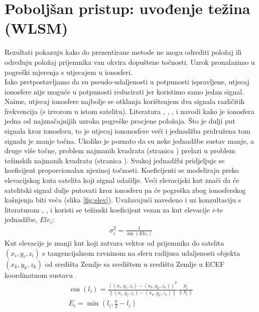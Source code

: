 \documentclass[a4paper,twoside,12pt]{memoir} %
\begin{document}

\section{Poboljšan pristup: uvođenje težina (WLSM)}\label{sec:algTezine}%
Rezultati pokazuju kako do prezentirane metode ne mogu odrediti položaj ili određuju položaj prijemnika van okvira dopuštene točnosti.
Uzrok pronalazimo u pogreški mjerenja s utjecajem u ionosferi.\\
Iako pretpostavljamo da su pseudo-udaljenosti u potpunosti ispravljene, utjecaj ionosfere nije moguće u potpunosti reducirati jer koristimo samo jedan signal.
Naime, utjecaj ionosfere najbolje se otklanja korištenjem dva signala različitih frekvencija (s izvorom u istom satelitu). 
Literatura \cite{ref:4}, \cite{ref:9}, \cite{ref:10}, \cite{ref:38} i
\cite{ref:34} navodi kako je ionosfera jedna od najznačajnijih uzroka pogreške
procjene položaja.
Što je dulji put signala kroz ionosferu, to je utjecaj iononosfere veći i jednadžba pridružena tom signalu
je manje točna. Ukoliko je poznato da su neke jednadžbe sustav manje, a druge više točne, problem najmanih kvadrata
(stranica \pageref{code:iterLSM}) prelazi u problem težinskih najmanih kvadrata (stranica \pageref{code:iterLSMW}).
Svakoj jednadžbi pridjeljuje se koeficijent proporcionalan njezinoj točnosti.
Koeficijenti se modeliraju preko elevacijskog kuta satelita koji signal odašilje.
Veći elevacijski kut znači da će satelitski signal dulje putovati kroz ionosferu pa će pogreška
zbog ionosferskog kašnjenja biti veća (slika \ref{fig:elev}).
Uvažavajući navedeno i uz konzultaciju s literaturom \cite{ref:13}, \cite{ref:34},
\cite{ref:45} i \cite{ref:25} koristi se težinski koeficijent vezan za kut elevacije $i$-te jednadžbe, $Ele_i$:%
\begin{align}\label{eq:elevationTezine1}
\sigma^2_i = \frac{1}{ \sin ( Ele_i ) }
\end{align}
Kut elevacije je manji kut koji zatvara vektor od prijemnika do satelita $(x_i,y_i,z_i)$ s tangencijalnom ravninom na sferu radijusa udaljenosti objekta $(x_k,y_k,z_k)$ od središta Zemlje sa središtem u središtu Zemlje u ECEF koordinatnom sustavu \cite{elevation_angle}.%
\begin{align}\label{eq:elevation}
	\cos (l_i) = \frac{((x_i,y_i,z_i)-(x_k,y_k,z_k))^T}{\| (x_i,y_i,z_i)-(x_k,y_k,z_k) \|} \frac{S_i}{\| S_i \|} \\
	E_i = \min(l_i, \frac{\pi}{2}-l_i)
\end{align}
\end{document}
